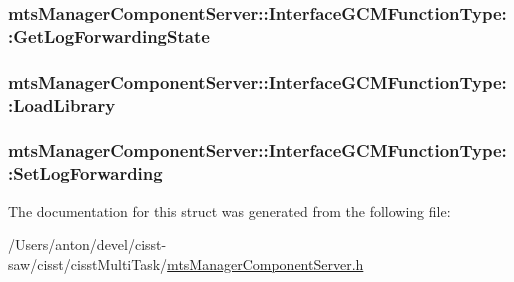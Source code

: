 \subsubsection[{Get\+Log\+Forwarding\+State}]{ mts\+Manager\+Component\+Server\+::\+Interface\+G\+C\+M\+Function\+Type\+::\+Get\+Log\+Forwarding\+State}\label{structmts_manager_component_server_1_1_interface_g_c_m_function_type_a7323a2480138e7cb183178bd7da16862}
\hypertarget{structmts_manager_component_server_1_1_interface_g_c_m_function_type_aa315e1ac5f0bfae4aca4435eea5ca8ff}{}
\subsubsection[{Load\+Library}]{ mts\+Manager\+Component\+Server\+::\+Interface\+G\+C\+M\+Function\+Type\+::\+Load\+Library}\label{structmts_manager_component_server_1_1_interface_g_c_m_function_type_aa315e1ac5f0bfae4aca4435eea5ca8ff}
\hypertarget{structmts_manager_component_server_1_1_interface_g_c_m_function_type_a77180d227fd77e4ad2de4862b82713d4}{}
\subsubsection[{Set\+Log\+Forwarding}]{ mts\+Manager\+Component\+Server\+::\+Interface\+G\+C\+M\+Function\+Type\+::\+Set\+Log\+Forwarding}\label{structmts_manager_component_server_1_1_interface_g_c_m_function_type_a77180d227fd77e4ad2de4862b82713d4}


The documentation for this struct was generated from the following file\+:\begin{DoxyCompactItemize}
\item 
/\+Users/anton/devel/cisst-\/saw/cisst/cisst\+Multi\+Task/\hyperlink{mts_manager_component_server_8h}{mts\+Manager\+Component\+Server.\+h}\end{DoxyCompactItemize}

